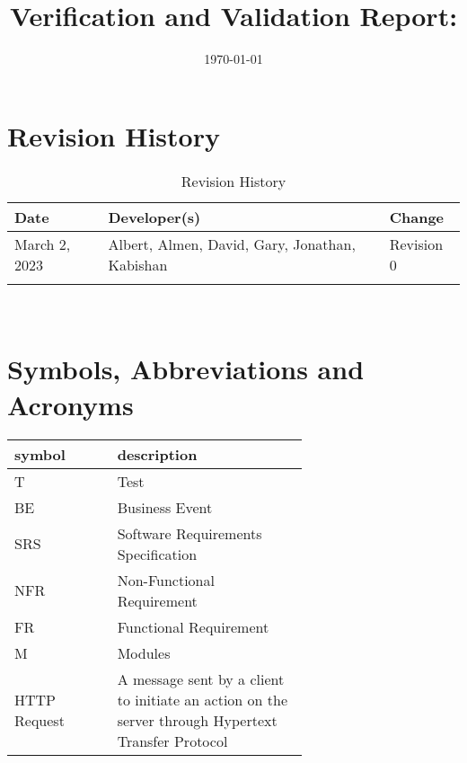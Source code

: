 \documentclass[12pt, titlepage]{article}
\begin{document}
\title{Verification and Validation Report: \progname} 
\author{\authname}
\date{\today}
	
\maketitle


\section{Revision History}

\begin{table}[hp]
\caption{Revision History} \label{TblRevisionHistory}
\begin{tabularx}{\textwidth}{lll}
\toprule
\textbf{Date} & \textbf{Developer(s)} & \textbf{Change}\\
\midrule
March 2, 2023 & Albert, Almen, David, Gary, Jonathan, Kabishan & Revision 0\\
\midrule
\color{red}{April 3, 2023} & \color{red}{Albert, Almen, David, Gary, Jonathan,
Kabishan} & \color{red}{Revision 1}\\
\bottomrule
\end{tabularx}
\end{table}

\color{black}
~\newpage

\section{Symbols, Abbreviations and Acronyms}

\renewcommand{\arraystretch}{1.2}
\begin{tabular}{l p{0.65\linewidth}} 
  \toprule		
  \textbf{symbol} & \textbf{description}\\
  \midrule 
  T & Test\\
  BE & Business Event\\
  SRS & Software Requirements Specification\\
  NFR & Non-Functional Requirement\\
  FR & Functional Requirement\\
  M & Modules \\
  HTTP Request & A message sent by a client to initiate an action on the server
  through Hypertext Transfer Protocol\\
  \bottomrule
\end{tabular}\\
\end{document}
